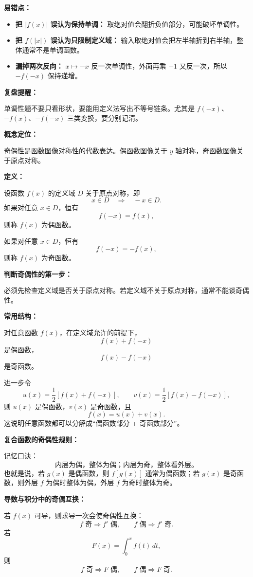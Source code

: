 \begin{mistakeBox}
\textbf{易错点：}

\begin{itemize}
  \item \textbf{把 \(|f(x)|\) 误认为保持单调：} 取绝对值会翻折负值部分，可能破坏单调性。
  \item \textbf{把 \(f(|x|)\) 误认为只限制定义域：} 输入取绝对值会把左半轴折到右半轴，整体通常不是单调函数。
  \item \textbf{漏掉两次反向：} \(x\mapsto -x\) 反一次单调性，外面再乘 \(-1\) 又反一次，所以 \(-f(-x)\) 保持递增。
\end{itemize}

\textbf{复盘提醒：}

单调性题不要只看形状，要能用定义法写出不等号链条。尤其是 \(f(-x)\)、\(-f(x)\)、\(-f(-x)\) 三类变换，要分别记清。
\end{mistakeBox}

\par

\begin{knowledgeBox}
\textbf{概念定位：}

奇偶性是函数图像对称性的代数表达。偶函数图像关于 \(y\) 轴对称，奇函数图像关于原点对称。

\textbf{定义：}

设函数 \(f(x)\) 的定义域 \(D\) 关于原点对称，即
\[
x\in D\quad\Longrightarrow\quad -x\in D.
\]
如果对任意 \(x\in D\)，恒有
\[
f(-x)=f(x),
\]
则称 \(f(x)\) 为偶函数。

如果对任意 \(x\in D\)，恒有
\[
f(-x)=-f(x),
\]
则称 \(f(x)\) 为奇函数。

\textbf{判断奇偶性的第一步：}

必须先检查定义域是否关于原点对称。若定义域不关于原点对称，通常不能谈奇偶性。

\textbf{常用结构：}

对任意函数 \(f(x)\)，在定义域允许的前提下，
\[
f(x)+f(-x)
\]
是偶函数，
\[
f(x)-f(-x)
\]
是奇函数。

进一步令
\[
u(x)=\frac12[f(x)+f(-x)],\qquad
v(x)=\frac12[f(x)-f(-x)],
\]
则 \(u(x)\) 是偶函数，\(v(x)\) 是奇函数，且
\[
f(x)=u(x)+v(x).
\]
这说明任意函数都可以分解成“偶函数部分 + 奇函数部分”。

\textbf{复合函数的奇偶性规则：}

记忆口诀：
\[
\text{内层为偶，整体为偶；内层为奇，整体看外层。}
\]
也就是说，若 \(g(x)\) 是偶函数，则 \(f[g(x)]\) 通常为偶函数；若 \(g(x)\) 是奇函数，则外层 \(f\) 为偶时整体为偶，外层 \(f\) 为奇时整体为奇。

\textbf{导数与积分中的奇偶互换：}

若 \(f(x)\) 可导，则求导一次会使奇偶性互换：
\[
f\text{ 奇}\Rightarrow f'\text{ 偶},\qquad
f\text{ 偶}\Rightarrow f'\text{ 奇}.
\]
若
\[
F(x)=\int_0^x f(t)\,dt,
\]
则
\[
f\text{ 奇}\Rightarrow F\text{ 偶},\qquad
f\text{ 偶}\Rightarrow F\text{ 奇}.
\]
\end{knowledgeBox}

